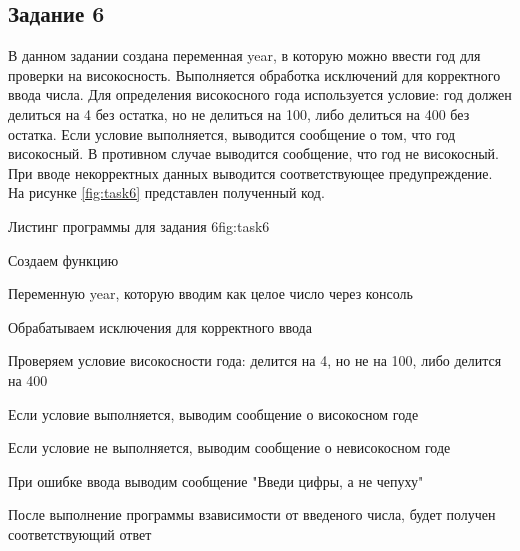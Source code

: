 \documentclass{vvsu}
\begin{document}
\subsection{Задание 6}
В данном задании создана переменная year, в которую можно ввести год для проверки на високосность. Выполняется обработка исключений для корректного ввода числа. Для определения високосного года используется условие: год должен делиться на 4 без остатка, но не делиться на 100, либо делиться на 400 без остатка. Если условие выполняется, выводится сообщение о том, что год високосный. В противном случае выводится сообщение, что год не високосный. При вводе некорректных данных выводится соответствующее предупреждение. На рисунке \ref{fig:task6} представлен полученный код.
\begin{vvsu_figure}{Листинг программы для задания 6}{fig:task6}
    \begin{minipage}{.75\textwidth}
        
    \end{minipage}
\end{vvsu_figure}

\begin{vvsu_list}
\item Создаем функцию 
\item Переменную year, которую вводим как целое число через консоль
\item Обрабатываем исключения для корректного ввода
\item Проверяем условие високосности года: делится на 4, но не на 100, либо делится на 400
\item Если условие выполняется, выводим сообщение о високосном годе
\item Если условие не выполняется, выводим сообщение о невисокосном годе
\item При ошибке ввода выводим сообщение "Введи цифры, а не чепуху"
\end{vvsu_list}


После выполнение программы взависимости от введеного числа, будет получен соответствующий ответ
\end{document}
